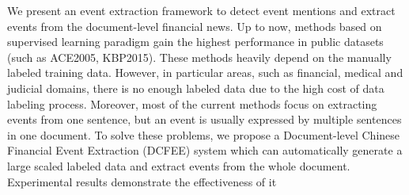 We present an event extraction framework to detect event mentions and extract events from the document-level financial news. Up to now, methods based on supervised learning paradigm gain the highest performance in public datasets (such as ACE2005, KBP2015). These methods heavily depend on the manually labeled training data. However, in particular areas, such as financial, medical and judicial domains, there is no enough labeled data due to the high cost of data labeling process. Moreover, most of the current methods focus on extracting events from one sentence, but an event is usually expressed by multiple sentences in one document. To solve these problems, we propose a Document-level Chinese Financial Event Extraction (DCFEE) system which can automatically generate a large scaled labeled data and extract events from the whole document. Experimental results demonstrate the effectiveness of it
